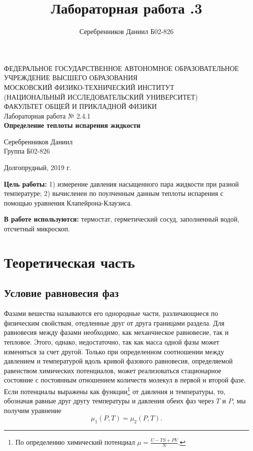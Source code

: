 \documentclass[a4paper,12pt]{article} %
\author{Серебренников Даниил Б02-826}
\title{Лабораторная работа \No 2.2.3}
\begin{document}
\begin{center}
\footnotesize{ФЕДЕРАЛЬНОЕ ГОСУДАРСТВЕННОЕ АВТОНОМНОЕ ОБРАЗОВАТЕЛЬНОЕ 			УЧРЕЖДЕНИЕ ВЫСШЕГО ОБРАЗОВАНИЯ}\\
\footnotesize{МОСКОВСКИЙ ФИЗИКО-ТЕХНИЧЕСКИЙ ИНСТИТУТ\\(НАЦИОНАЛЬНЫЙ 			ИССЛЕДОВАТЕЛЬСКИЙ УНИВЕРСИТЕТ)}\\
\footnotesize{ФАКУЛЬТЕТ ОБЩЕЙ И ПРИКЛАДНОЙ ФИЗИКИ\\}
\hfill \break
\hfill\break
\hfill\break
\hfill \break
\hfill \break
\hfill \break
\hfill \break
\hfill \break
\hfill \break
\hfill \break
\hfill \break
\hfill \break
\hfill \break
\hfill \break
\hfill \break
\large{Лабораторная работа № 2.4.1\\\textbf{Определение теплоты испарения жидкости}}\\
\hfill \break
\hfill \break
\hfill \break
\begin{flushright}
	Серебренников Даниил\\
	Группа Б02-826
\end{flushright}
\hfill \break
\hfill \break
\hfill \break
\hfill \break
\hfill \break
\end{center}
\hfill \break
\hfill \break
\hfill \break
\hfill \break
\hfill \break
\hfill \break
\begin{center}
	Долгопрудный, 2019 г.
\end{center}
\thispagestyle{empty} %


\newpage
\textbf{Цель работы:} 1) измерение давления насыщенного пара жидкости при разной температуре; 2) вычисленеи по поулченным данным теплоты испарения с помощью уравнения Клапейрона-Клаузиса.

\textbf{В работе используются:} термостат, герметический сосуд, заполненный водой, отсчетный микроскоп.

\section{Теоретическая часть}
\subsection{Условие равновесия фаз}
	Фазами вешества называются его однородные части, различающиеся по физическим свойствам, отедленные друг от друга границами раздела. Для равновесия между фазами необходимо, как механчиеское равновесие, так и тепловое. Этого, однако, недостаточно, так как масса одной фазы может изменяться за счет другой. Только при определенном соотношении между давлением и температурой вдоль кривой фазового равновесия, определяемой равенством химических потенциалов, может реализоваться стационарное состояние с постоянным отношением количеств молекул в первой и второй фазе. Если потенциалы выражены как функции\footnote{По определению химический потенциал $\mu = \frac{U - TS + PV}{N}$.} от давления и температуры, то, обозначая равные друг другу температуры и давления обеих фаз через $T$ и $P$, мы получим уравнение
\begin{equation}
	\label{ravnovesie_faz}
	\mu_1(P, T) = \mu_2(P, T).
\end{equation}
\end{document}
